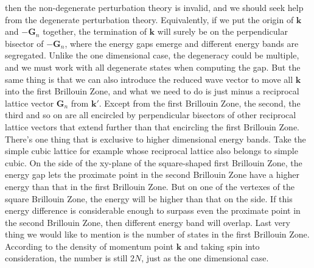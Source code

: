 \documentclass{article}
\begin{document}
then the non-degenerate perturbation theory is invalid, and we should seek help from the degenerate perturbation theory. Equivalently, if we put the origin of $\mathbf{k}$ and $-\mathbf{G}_n$ together, the termination of $\mathbf{k}$ will surely be on the perpendicular bisector of $-\mathbf{G}_n$, where the energy gaps emerge and different energy bands are segregated. Unlike the one dimensional case, the degeneracy could be multiple, and we must work with all degenerate states when computing the gap. But the same thing is that we can also introduce the reduced wave vector to move all $\mathbf{k}$ into the first Brillouin Zone, and what we need to do is just minus a reciprocal lattice vector $\mathbf{G}_n$ from $\mathbf{k}'$. Except from the first Brillouin Zone, the second, the third and so on are all encircled by perpendicular bisectors of other reciprocal lattice vectors that extend further than that encircling the first Brillouin Zone. There's one thing that is exclusive to higher dimensional energy bands. Take the simple cubic lattice for example whose reciprocal lattice also belongs to simple cubic. On the side of the xy-plane of the square-shaped first Brillouin Zone, the energy gap lets the proximate point in the second Brillouin Zone have a higher energy than that in the first Brillouin Zone. But on one of the vertexes of the square Brillouin Zone, the energy will be higher than that on the side. If this energy difference is considerable enough to surpass even the proximate point in the second Brillouin Zone, then different energy band will overlap. Last very thing we would like to mention is the number of states in the first Brillouin Zone. According to the density of momentum point $\mathbf{k}$ and taking spin into consideration, the number is still $2N$, just as the one dimensional case.
\end{document}
